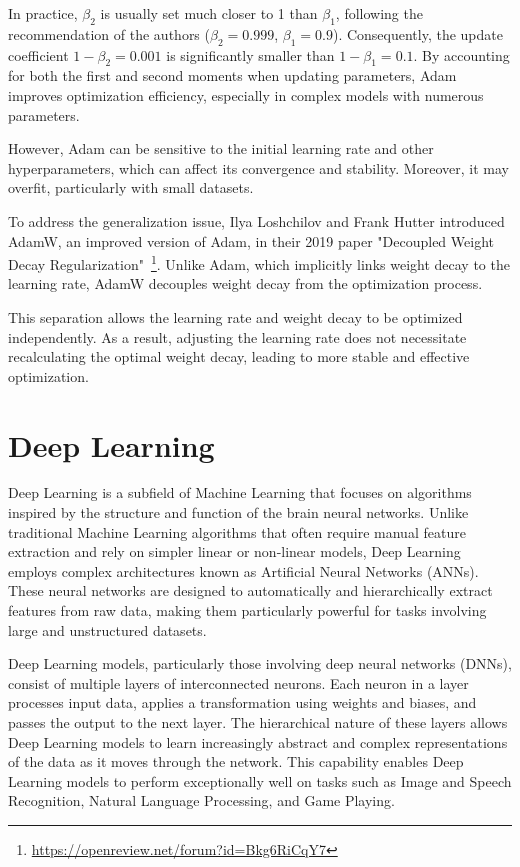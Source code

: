 \documentclass[12pt,a4paper]{report}
\begin{document}
In practice, \(\beta_2\) is usually set much closer to 1 than \(\beta_1\), following the recommendation of the authors (\(\beta_2 = 0.999\), \(\beta_1 = 0.9\)). Consequently, the update coefficient \(1 - \beta_2 = 0.001\) is significantly smaller than \(1 - \beta_1 = 0.1\). By accounting for both the first and second moments when updating parameters, Adam improves optimization efficiency, especially in complex models with numerous parameters.

However, Adam can be sensitive to the initial learning rate and other hyperparameters, which can affect its convergence and stability. Moreover, it may overfit, particularly with small datasets.

To address the generalization issue, Ilya Loshchilov and Frank Hutter introduced AdamW, an improved version of Adam, in their 2019 paper "Decoupled Weight Decay Regularization"~\footnote{\url{https://openreview.net/forum?id=Bkg6RiCqY7}}. Unlike Adam, which implicitly links weight decay to the learning rate, AdamW decouples weight decay from the optimization process.

This separation allows the learning rate and weight decay to be optimized independently. As a result, adjusting the learning rate does not necessitate recalculating the optimal weight decay, leading to more stable and effective optimization.

\section{Deep Learning}
Deep Learning is a subfield of Machine Learning that focuses on algorithms inspired by the structure and function of the brain neural networks. Unlike traditional Machine Learning algorithms that often require manual feature extraction and rely on simpler linear or non-linear models, Deep Learning employs complex architectures known as Artificial Neural Networks (ANNs). These neural networks are designed to automatically and hierarchically extract features from raw data, making them particularly powerful for tasks involving large and unstructured datasets.

Deep Learning models, particularly those involving deep neural networks (DNNs), consist of multiple layers of interconnected neurons. Each neuron in a layer processes input data, applies a transformation using weights and biases, and passes the output to the next layer. The hierarchical nature of these layers allows Deep Learning models to learn increasingly abstract and complex representations of the data as it moves through the network. This capability enables Deep Learning models to perform exceptionally well on tasks such as Image and Speech Recognition, Natural Language Processing, and Game Playing.
\end{document}
